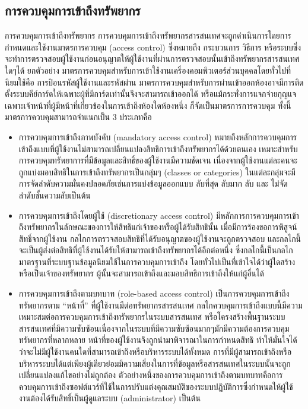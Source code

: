 \documentclass[../th_cyber_warfare_distilled.tex]{subfiles}
\begin{document}
\subsection{การควบคุมการเข้าถึงทรัพยากร}
การควบคุมการเข้าถึงทรัพยากร
การควบคุมการเข้าถึงทรัพยากรสารสนเทศจะถูกดำเนินการโดยการกำหนดและใช้งานมาตรการควบคุม (access control) ซึ่งหมายถึง กระบวนการ วิธีการ หรือระบบซึ่งจะทำการตรวจสอบผู้ใช้งานก่อนอนุญาตให้ผู้ใช้งานที่ผ่านการตรวจสอบนั้นเข้าถึงทรัพยากรสารสนเทศใดๆได้ ยกตัวอย่าง มาตรการควบคุมสำหรับการเข้าใช้งานเครื่องคอมพิวเตอร์ส่วนบุคคลโดยทั่วไปที่นิยมใช้คือ การป้อนรหัสผู้ใช้งานและรหัสผ่าน มาตรการควบคุมสำหรับการผ่านเข้าออกห้องอาจมีการติดตั้งระบบคีย์การ์ดให้เฉพาะผู้ที่มีการ์ดเท่านั้นจึงจะสามารถเข้าออกได้ หรือแม้กระทั่งการแจกจ่ายกุญแจเฉพาะเจ้าหน้าที่ผู้มีหน้าที่เกี่ยวข้องในการเข้าถึงห้องใดห้องหนึ่ง ก็จัดเป็นมาตรการการควบคุม ทั้งนี้มาตรการควบคุมสามารถจำแนกเป็น 3 ประเภทคือ
\begin{itemize}
	\item การควบคุมการเข้าถึงภาพบังคับ (mandatory access control) หมายถึงหลักการควบคุมการเข้าถึงแบบที่ผู้ใช้งานไม่สามารถเปลี่ยนแปลงสิทธิการเข้าถึงทรัพยากรได้ด้วยตนเอง เหมาะสำหรับการควบคุมทรัพยาการที่มีข้อมูลและสิทธิ์ของผู้ใช้งานมีความชัดเจน เนื่องจากผู้ใช้งานแต่ละคนจะถูกแบ่งมอบสิทธิในการเข้าถึงทรัพยากรเป็นกลุ่มๆ (classes or categories) ในแต่ละกลุ่มจะมีการจัดลำดับความมั่นคงปลอดภัยเช่นการแบ่งข้อมูลออกแบบ ลับที่สุด ลับมาก ลับ และ ไม่จัดลำดับชั้นความลับเป็นต้น
	\item การควบคุมการเข้าถึงโดยผู้ใช้ (discretionary access control) มีหลักการการควบคุมการเข้าถึงทรัพยากรในลักษณะของการให้สิทธิแก่เจ้าของหรือผู้ได้รับสิทธินั้น เมื่อมีการร้องขอการพิสูจน์สิทธิ์จากผู้ใช้งาน กลไกการตรวจสอบสิทธิที่ได้รับอนุญาตของผู้ใช้งานจะถูกตรวจสอบ และกลไกนี้จะเป็นผู้ส่งต่อสิทธิที่ผู้ใช้งานได้รับให้สามารถเข้าถึงทรัพยากรได้อีกต่อหนึ่ง ซึ่งกลไกนี้เป็นกลไกมาตรฐานที่ระบบฐานข้อมูลนิยมใช้ในการควบคุมการเข้าถึง โดยทั่วไปเป็นที่เข้าใจได้ว่าผู้ใดสร้างหรือเป็นเจ้าของทรัพยากร ผู้นั้นจะสามารถเข้าถึงและมอบสิทธิการเข้าถึงให้แก่ผู้อื่นได้
	\item การควบคุมการเข้าถึงตามบทบาท (role-based access control) เป็นการควบคุมการเข้าถึงทรัพยากรตาม “หน้าที่” ที่ผู้ใช้งานมีต่อทรัพยากรสารสนเทศ กลไกควบคุมการเข้าถึงแบบนี้มีความเหมาะสมต่อการควบคุมการเข้าถึงทรัพยากรในระบบสารสนเทศ หรือโครงสร้างพื้นฐานระบบสารสนเทศที่มีความซับซ้อนเนื่องจากในระบบที่มีความซับซ้อนมากๆมักมีความต้องการควบคุมทรัพยากรที่หลากหลาย หน้าที่ของผู้ใช้งานจึงถูกนำมาพิจารณาในการกำหนดสิทธิ ทำให้มั่นใจได้ว่าจะไม่มีผู้ใช้งานคนใดที่สามารถเข้าถึงหรือบริหารระบบได้ทั้งหมด การที่มีผู้สามารถเข้าถึงหรือบริหารระบบได้แต่เพียงผู้เดียวย่อมมีความเสี่ยงในการที่ข้อมูลหรือสารสนเทศในระบบนั้นจะถูกเปลี่ยนแปลงแก้ไขอย่างไม่ถูกต้อง ตัวอย่างหนึ่งของการควบคุมการเข้าถึงตามบทบาทคือการควบคุมการเข้าถึงซอฟต์แวร์ที่ใช้ในการปรับแต่งคุณสมบัติของระบบปฏิบัติการซึ่งกำหนดให้ผู้ใช้งานต้องได้รับสิทธิ์เป็นผู้ดูแลระบบ (administrator) เป็นต้น
\end{itemize}
\end{document}
